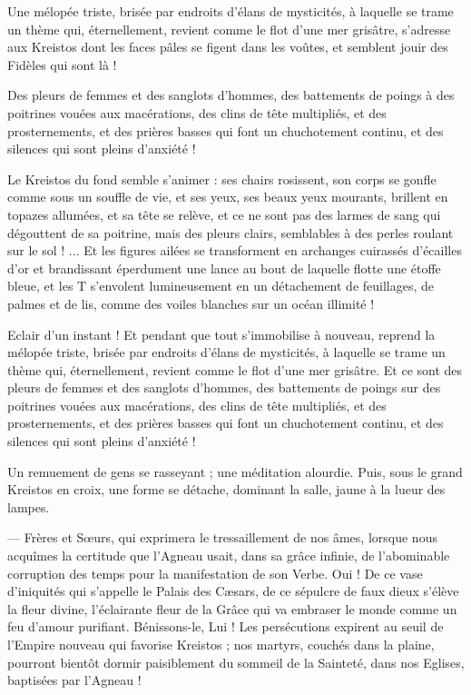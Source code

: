 \documentclass[a4paper, 11pt, oneside, polutonikogreek, french]{article}
\begin{document}
Une mélopée triste, brisée par endroits d'élans de mysticités, à laquelle se trame un thème qui, éternellement, revient comme le flot d'une mer grisâtre, s'adresse aux Kreistos dont les faces pâles se figent dans les voûtes, et semblent jouir des Fidèles qui sont là !

Des pleurs de femmes et des sanglots d'hommes, des battements de poings à des poitrines vouées aux macérations, des clins de tête multipliés, et des prosternements, et des prières basses qui font un chuchotement continu, et des silences qui sont pleins d'anxiété !

Le Kreistos du fond semble s'animer : ses chairs rosissent, son corps se gonfle comme sous un souffle de vie, et ses yeux, ses beaux yeux mourants, brillent en topazes allumées, et sa tête se relève, et ce ne sont pas des larmes de sang qui dégouttent de sa poitrine, mais des pleurs clairs, semblables à des perles roulant sur le sol ! ... Et les figures ailées se transforment en archanges cuirassés d'écailles d'or et brandissant éperdument une lance au bout de laquelle flotte une étoffe bleue, et les T s'envolent lumineusement en un détachement de feuillages, de palmes et de lis, comme des voiles blanches sur un océan illimité !

Eclair d'un instant ! Et pendant que tout s'immobilise à nouveau, reprend la mélopée triste, brisée par endroits d'élans de mysticités, à laquelle se trame un thème qui, éternellement, revient comme le flot d'une mer grisâtre. Et ce sont des pleurs de femmes et des sanglots d'hommes, des battements de poings sur des poitrines vouées aux macérations, des clins de tête multipliés, et des prosternements, et des prières basses qui font un chuchotement continu, et des silences qui sont pleins d'anxiété !

Un remuement de gens se rasseyant ; une méditation alourdie. Puis, sous le grand Kreistos en croix, une forme se détache, dominant la salle, jaune à la lueur des lampes.

--- Frères et Sœurs, qui exprimera le tressaillement de nos âmes, lorsque nous acquîmes la certitude que l'Agneau usait, dans sa grâce infinie, de l'abominable corruption des temps pour la manifestation de son Verbe. Oui ! De ce vase d'iniquités qui s'appelle le Palais des Cæsars, de ce sépulcre de faux dieux s'élève la fleur divine, l'éclairante fleur de la Grâce qui va embraser le monde comme un feu d'amour purifiant. Bénissons-le, Lui ! Les persécutions expirent au seuil de l'Empire nouveau qui favorise Kreistos ; nos martyrs, couchés dans la plaine, pourront bientôt dormir paisiblement du sommeil de la Sainteté, dans nos Eglises, baptisées par l'Agneau !
\end{document}
